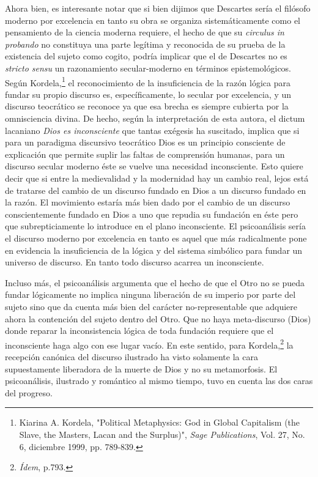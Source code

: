 \documentclass{book}
\begin{document}
Ahora bien, es interesante notar que si bien dijimos que Descartes sería
el filósofo moderno por excelencia en tanto su obra se organiza
sistemáticamente como el pensamiento de la ciencia moderna requiere, el
hecho de que su \emph{circulus in probando} no constituya una parte
legítima y reconocida de su prueba de la existencia del sujeto como
cogito, podría implicar que el de Descartes no es \emph{stricto sensu}
un razonamiento secular-moderno en términos epistemológicos. Según
Kordela,\footnote{Kiarina A. Kordela, "Political Metaphysics: God in
  Global Capitalism (the Slave, the Masters, Lacan and the Surplus)",
  \emph{Sage Publications}, Vol. 27, No. 6, diciembre 1999, pp. 789-839.}
el reconocimiento de la insuficiencia de la razón lógica para fundar su
propio discurso es, específicamente, lo secular por excelencia, y un
discurso teocrático se reconoce ya que esa brecha es siempre cubierta
por la omnisciencia divina. De hecho, según la interpretación de esta
autora, el dictum lacaniano \emph{Dios es inconsciente} que tantas
exégesis ha suscitado, implica que si para un paradigma discursivo
teocrático Dios es un principio consciente de explicación que permite
suplir las faltas de comprensión humanas, para un discurso secular
moderno éste se vuelve una necesidad inconsciente. Esto quiere decir que
si entre la medievalidad y la modernidad hay un cambio real, lejos está
de tratarse del cambio de un discurso fundado en Dios a un discurso
fundado en la razón. El movimiento estaría más bien dado por el cambio
de un discurso conscientemente fundado en Dios a uno que repudia su
fundación en éste pero que subrepticiamente lo introduce en el plano
inconsciente. El psicoanálisis sería el discurso moderno por excelencia
en tanto es aquel que más radicalmente pone en evidencia la
insuficiencia de la lógica y del sistema simbólico para fundar un
universo de discurso. En tanto todo discurso acarrea un inconsciente.

Incluso más, el psicoanálisis argumenta que el hecho de que el Otro no
se pueda fundar lógicamente no implica ninguna liberación de su imperio
por parte del sujeto sino que da cuenta más bien del carácter
no-representable que adquiere ahora la contención del sujeto dentro del
Otro. Que no haya meta-discurso (Dios) donde reparar la inconsistencia
lógica de toda fundación requiere que el inconsciente haga algo con ese
lugar vacío. En este sentido, para Kordela,\footnote{\emph{Ídem}, p.793.}
la recepción canónica del discurso ilustrado ha visto solamente la cara
supuestamente liberadora de la muerte de Dios y no su metamorfosis. El
psicoanálisis, ilustrado y romántico al mismo tiempo, tuvo en cuenta las
dos caras del progreso.
\end{document}
